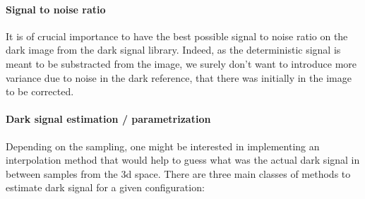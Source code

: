 \documentclass{article}
\begin{document}
    \paragraph{Signal to noise ratio} It is of crucial importance to have the best possible signal to noise ratio on the dark image from the dark signal library. Indeed, as the deterministic signal is meant to be substracted from the image, we surely don't want to introduce more variance due to noise in the dark reference, that there was initially in the image to be corrected.

    \paragraph{Dark signal estimation / parametrization}
    Depending on the sampling, one might be interested in implementing an interpolation method that would help to guess what was the actual dark signal in between samples from the 3d space.
    There are three main classes of methods to estimate dark signal for a given configuration:
\end{document}
